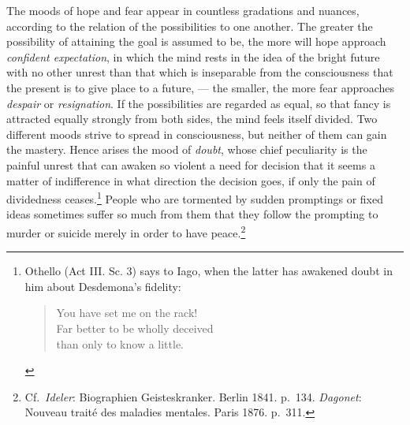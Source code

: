 \documentclass[12pt,a4paper]{book}
\newcommand{\opage}[1]{\marginnote{\footnotesize\textit{[#1]}}}
\begin{document}
The moods of hope and fear appear in countless gradations and nuances,
according to the relation of the possibilities to one another. The
greater the possibility of attaining the goal is assumed to be, the more
will hope approach \emph{confident expectation}, in which the mind rests
in the idea of the bright future with no other unrest than that which is
inseparable from the consciousness that the present is to give place to
a future, --- the smaller, the more fear approaches \emph{despair} or
\emph{resignation}. If the possibilities are regarded as equal, so that
fancy is attracted equally strongly from both sides, the mind feels
itself divided. Two different moods strive to spread in consciousness,
but neither of them can gain the mastery. Hence arises the mood of
\emph{doubt}, whose chief peculiarity is the painful unrest that
\opage{286}can awaken so violent a need for decision that it seems a
matter of indifference in what direction the decision goes, if only the
pain of dividedness
ceases.\footnote{Othello (Act III. Sc. 3) says to Iago, when the latter
has awakened doubt in him about Desdemona's fidelity:
\begin{verse}
You have set me on the rack!\\
Far better to be wholly deceived\\
than only to know a little.
\end{verse}}
People who are tormented by sudden promptings or fixed ideas sometimes
suffer so much from them that they follow the prompting to murder or
suicide merely in order
to have peace.\footnote{Cf.\ \emph{Ideler}: Biographien Geisteskranker.
Berlin 1841. p.~134. \emph{Dagonet}: Nouveau traité des maladies
mentales. Paris 1876. p.~311.}
\end{document}
